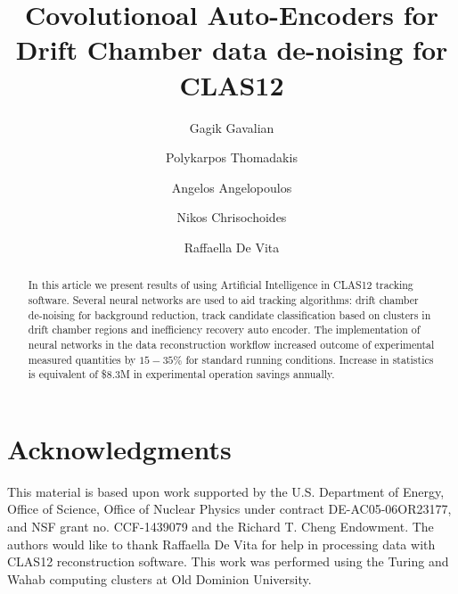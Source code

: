 \documentclass[preprint,12pt]{elsarticle}
\title{Covolutionoal Auto-Encoders for Drift Chamber data de-noising for CLAS12}
\author[1]{Gagik Gavalian}
\author[2]{Polykarpos Thomadakis}
\author[2]{Angelos Angelopoulos}
\author[2]{Nikos Chrisochoides}
\author[3]{Raffaella De Vita}
\begin{document}
\begin{abstract}

In this article we present results of using Artificial Intelligence in CLAS12 tracking software. Several neural networks are used to aid tracking algorithms: drift chamber de-noising for background reduction, track candidate classification based on clusters in drift chamber regions and inefficiency recovery auto encoder. The implementation of neural networks in the data reconstruction workflow increased outcome of experimental measured quantities by $15-35\%$ for standard running conditions. Increase in statistics is equivalent of \$$8.3$M in experimental operation savings annually.

\end{abstract}
\maketitle











%



\newpage

\section{Acknowledgments}

This material is based upon work supported by the U.S. Department of Energy, Office of Science,
Office of Nuclear Physics under contract DE-AC05-06OR23177, and NSF grant no. CCF-1439079 and
the Richard T. Cheng Endowment. The authors would like to thank Raffaella De Vita for help in
processing data with CLAS12 reconstruction software. This work was performed using the Turing
and Wahab computing clusters at Old Dominion University.
 
\newpage


\end{document}
